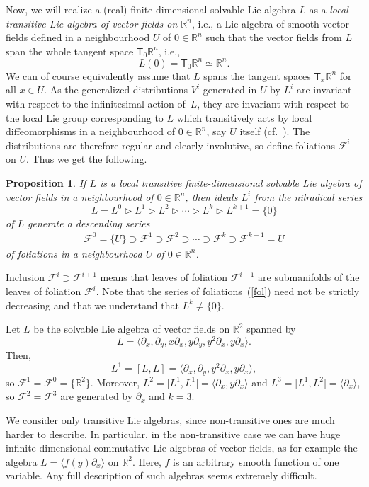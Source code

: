 \documentclass[pdftex]{sigma}
\numberwithin{equation}{section}
\newtheorem{Proposition}[Theorem]{Proposition}
 { \theoremstyle{definition}
\newtheorem{Definition}[Theorem]{Definition}
\newtheorem{Example}[Theorem]{Example}
\newtheorem{Remark}[Theorem]{Remark} }
\begin{document}
Now, we will realize a (real) finite-dimensional solvable Lie algebra $L$ as a \emph{local transitive Lie algebra of vector fields on ${\mathbb R}^n$}, i.e., a Lie algebra of smooth vector fields defined in a neighbourhood $U$ of $0\in{\mathbb R}^n$ such that the vector fields from $L$ span the whole tangent space ${\mathsf T}_0{\mathbb R}^n$, i.e.,
\[ L(0)={\mathsf T}_0{\mathbb R}^n\simeq{\mathbb R}^n .\]
We can of course equivalently assume that $L$ spans the tangent spaces ${\mathsf T}_x{\mathbb R}^n$ for all $x\in U$.
As the generalized distributions $V^i$ generated in $U$ by $L^i$ are invariant with respect to the infinitesimal action of~$L$, they are invariant with respect to the local Lie group corresponding to $L$ which transitively acts by local diffeomorphisms in a neighbourhood of $0\in{\mathbb R}^n$, say $U$ itself (cf.~\cite{Palais}). The distributions are therefore regular and clearly involutive, so define foliations ${\mathcal F}^i$ on $U$. Thus we get the following.

\begin{Proposition}
If $L$ is a local transitive finite-dimensional solvable Lie algebra of vector fields in a neighbourhood of $0\in{\mathbb R}^n$, then ideals $L^i$ from the nilradical series
\[ L=L^0\vartriangleright L^1\vartriangleright L^2\vartriangleright\cdots\vartriangleright L^k\vartriangleright L^{k+1}=\{ 0\}\]
of $L$ generate a descending series
\begin{gather}\label{fol}{\mathcal F}^0=\{ U\}\supset{\mathcal F}^1\supset{\mathcal F}^2\supset \cdots\supset {\mathcal F}^{k}\supset {\mathcal F}^{k+1}=U \end{gather}
of foliations in a neighbourhood $U$ of $0\in{\mathbb R}^n$.
\end{Proposition}

Inclusion ${\mathcal F}^i\supset{\mathcal F}^{i+1}$ means that leaves of foliation ${\mathcal F}^{i+1}$ are submanifolds of the leaves of foliation ${\mathcal F}^{i}$. Note that the series of foliations~(\ref{fol}) need not be strictly decreasing and that we understand that $L^k\ne\{ 0\}$.
\begin{Example}\label{ex2}
Let $L$ be the solvable Lie algebra of vector fields on ${\mathbb R}^2$ spanned by
\[ L=\big\langle \partial_x ,\partial_y ,x\partial_x ,y\partial_y ,y^2\partial_x ,y\partial_x\big\rangle .\]
Then,
\[ L^1=[L,L]=\big\langle \partial_x ,\partial_y ,y^2\partial_x ,y\partial_x\big\rangle ,\]
so ${\mathcal F}^1={\mathcal F}^0=\big\{{\mathbb R}^2\big\}$. Moreover, $L^2=\big[L^1,L^1\big]=\langle\partial_x ,y\partial_x\rangle$ and $L^3=\big[L^1,L^2\big]=\langle\partial_x\rangle$, so ${\mathcal F}^2={\mathcal F}^3$ are generated by $\partial_x$ and $k=3$.
\end{Example}
\begin{Remark}We consider only transitive Lie algebras, since non-transitive ones are much harder to describe. In particular, in the non-transitive case we can have huge infinite-dimensional commutative Lie algebras of vector fields, as for example
the algebra $L=\langle f(y)\partial_x\rangle$ on ${\mathbb R}^2$. Here, $f$ is an arbitrary smooth function of one variable.
Any full description of such algebras seems extremely difficult.
\end{Remark}
\end{document}
